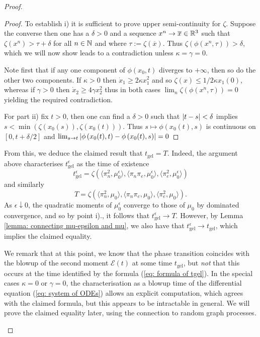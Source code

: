 \begin{proof}
\begin{proof}
To establish i) it is sufficient to prove upper semi-continuity for $\zeta$.
Suppose the converse then one has a $\delta>0$ and a sequence $x^n \rightarrow \overline{x} \in \mathbb{R}^3$ such that
$\zeta(x^n) > \tau + \delta $ for all $n\in \mathbb{N}$ and where $\tau := \zeta(\overline{x})$.
Thus $\zeta\left(\phi(x^n,\tau)\right) > \delta $, which we will now show leads to a contradiction unless $\kappa = \gamma = 0$.

Note first that if any one component of $\phi(x_0,t)$ diverges to $+\infty$, then so do the other two components.
If $\kappa > 0$ then $\dot x_1 \geq 2\kappa x_1^2$ and so $\zeta(x) \leq 1 / 2\kappa x_1(0)$, whereas if $\gamma > 0$ then $\dot x_2 \geq 4\gamma x_2^2$ thus in both cases $\lim_n \zeta\left(\phi(x^n,\tau)\right) = 0$ yielding the required contradiction.

For part ii) fix $t>0$, then one can find a $\delta > 0$ such that $\left\lvert{t-s}\right\rvert < \delta$ implies $s < \min \left(\zeta\left(x_0(s)\right), \zeta\left(x_0(t)\right)\right)$.
Thus $s \mapsto \phi\left(x_0(t), s\right)$ is continuous on $\left[0,t+\delta/2\right]$ and $\lim_{s \rightarrow t} \left\lvert{\phi\left(x_0(t),t\right) - \phi\left(x_0(t),s\right)}\right\rvert = 0$
\end{proof}

From this, we deduce the claimed result that $t_\mathrm{gel}=T$. Indeed, the argument above characterises $t_\mathrm{gel}^\epsilon$ as the time of existence \begin{equation}
    t_\mathrm{gel}^\epsilon=\zeta(\langle \pi_n^2, \mu^\epsilon_0\rangle, \langle \pi_n \pi_e, \mu^\epsilon_0\rangle, \langle \pi_e^2, \mu_0^\epsilon\rangle)
\end{equation} and similarly \begin{equation}  T=\zeta(\langle \pi_n^2, \mu_0\rangle, \langle \pi_n \pi_e, \mu_0\rangle, \langle \pi_e^2, \mu_0\rangle). \end{equation} As $\epsilon \downarrow 0$, the quadratic moments of $\mu^\epsilon_0$ converge to those of $\mu_0$ by dominated convergence, and so by point i)., it follows that $t^\epsilon_\mathrm{gel}\rightarrow T$. However, by Lemma \ref{lemma: connecting mu-epsilon and mu}, we also have that $t_\mathrm{gel}^\epsilon\rightarrow t_\mathrm{gel}$, which implies the claimed equality.

\begin{remark} We remark that at this point, we know that the phase transition coincides with the blowup of the second moment $\mathcal{E}(t)$ at some time $t_\mathrm{gel}$, but \emph{not} that this occurs at the time identified by the formula (\ref{eq: formula of tgel}). In the special cases $\kappa=0$ or $\gamma=0$, the characterisation as a blowup time of the differential equation (\ref{eq: system of ODEs}) allows an explicit computation, which agrees with the claimed formula, but this appears to be intractable in general. We will prove the claimed equality later, using the connection to random graph processes. \end{remark}



\end{proof}

